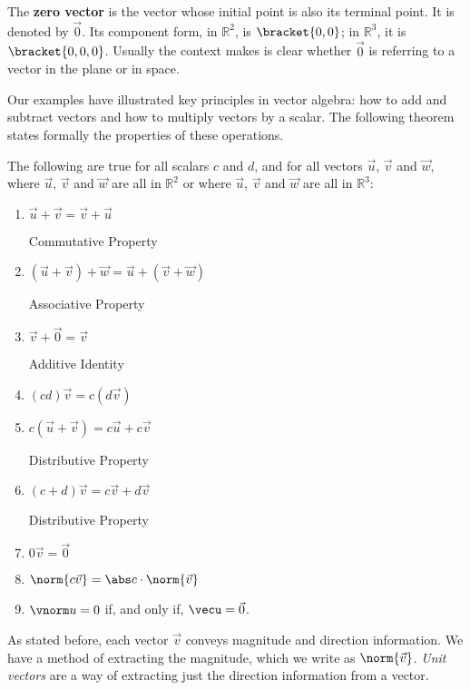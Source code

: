The \textbf{zero vector} is the vector whose initial point is also its terminal point. It is denoted by $\vec 0$. Its component form, in $\mathbb{R}^2$, is $\bracket{0,0}$; in $\mathbb{R}^3$, it is $\bracket{0,0,0}$. Usually the context makes is clear whether $\vec 0$ is referring to a vector in the plane or in space.

Our examples have illustrated key principles in vector algebra: how to add and subtract vectors and how to multiply vectors by a scalar. The following theorem states formally the properties of these operations.

{The following are true for all scalars $c$ and $d$, and for all vectors $\vec u$, $\vec v$ and $\vec w$, where $\vec u$, $\vec v$ and $\vec w$ are all in $\mathbb{R}^2$ or where $\vec u$, $\vec v$ and $\vec w$ are all in $\mathbb{R}^3$:
\begin{enumerate}
	\item \parbox{150pt}{$\vec u+\vec v = \vec v+\vec u$}Commutative Property
	\item \parbox{150pt}{$(\vec u+\vec v)+\vec w = \vec u+(\vec v+\vec w)$}Associative Property
	\item \parbox{150pt}{$\vec v+\vec 0 = \vec v$}Additive Identity
	\item \parbox{150pt}{$(cd)\vec v= c(d\vec v)$}
	\item \parbox{150pt}{$c(\vec u+\vec v) = c\vec u+c\vec v$}Distributive Property
	\item \parbox{150pt}{$(c+d)\vec v = c\vec v+d\vec v$}Distributive Property
	\item \parbox{150pt}{$0\vec v = \vec 0$}
	\item	\parbox{150pt}{$\norm{c\vec v} = \abs c\cdot\norm{\vec v}$}\label{thm:norm_prop}
	\item	$\vnorm u = 0$ if, and only if, $\vecu = \vec 0$.  \label{thm:zero_norm}
\end{enumerate}}

%

As stated before, each vector $\vec v$ conveys magnitude and direction information. We have a method of extracting the magnitude, which we write as $\norm{\vec v}$. \textit{Unit vectors} are a way of extracting just the direction information from a vector.

